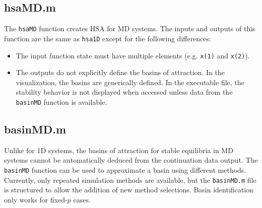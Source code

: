 \documentclass[12pt]{article}
\begin{document}
\subsection{hsaMD.m}
The \texttt{hsaMD} function creates HSA for MD systems. The inputs and outputs of this function are the same as \texttt{hsa1D} except for the following differences:

\begin{itemize}
\item The input function state must have multiple elements (e.g. \texttt{x(1)} and \texttt{x(2)}).
\item The outputs do not explicitly define the basins of attraction. In the visualization, the basins are generically defined. In the executable file, the stability behavior is not displayed when accessed unless data from the \texttt{basinMD} function is available.
\end{itemize}


\subsection{basinMD.m}
Unlike for 1D systems, the basins of attraction for stable equilibria in MD systems cannot be automatically deduced from the continuation data output. The \texttt{basinMD} function can be used to approximate a basin using different methods. Currently, only repeated simulation methods are available, but the \texttt{basinMD.m} file is structured to allow the addition of new method selections. Basin identification only works for fixed-$p$ cases.
\end{document}
